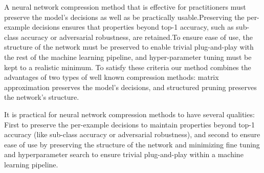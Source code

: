A neural network compression method that is effective for practitioners must preserve the model's decisions as well as be practically usable.Preserving the per-example decisions ensures that properties beyond top-1 accuracy, such as sub-class accuracy or adversarial robustness, are retained.To ensure ease of use, the structure of the network must be preserved to enable trivial plug-and-play with the rest of the machine learning pipeline, and hyper-parameter tuning must be kept to a realistic minimum.
To satisfy these criteria our method combines the advantages of two types of well known compression methods: matrix approximation preserves the model's decisions, and structured pruning preserves the network's structure.


It is practical for neural network compression methods to have several qualities:  First to preserve the per-example decisions to maintain properties beyond top-1 accuracy (like sub-class accuracy or adversarial robustness), and second to ensure ease of use by preserving the structure of the network and minimizing fine tuning and hyperparameter search to ensure trivial plug-and-play within a machine learning pipeline.  